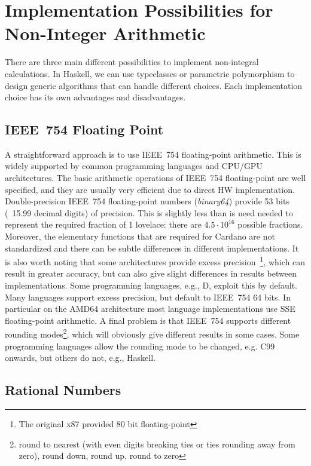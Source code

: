 \documentclass[11pt,a4paper,dvipsnames]{article}
\newcommand{\khcomment}[1]{\todo[color=blue!20]{KH: #1}}
\theoremstyle{definition}
\theoremstyle{definition}
\begin{document}
\section{Implementation Possibilities for Non-Integer Arithmetic}
\label{sec:impl-poss}

There are three main different possibilities to implement non-integral
calculations. In Haskell, we can use typeclasses or parametric polymorphism
to design generic algorithms that can handle different choices. Each implementation choice has its
own advantages and disadvantages.

\subsection{IEEE~754 Floating Point}
\label{sec:ieee-754-floating}

A straightforward approach is to use IEEE~754 floating-point arithmetic.  This is
widely supported by common programming languages and CPU/GPU architectures.
%
The basic arithmetic operations of IEEE~754 floating-point are well specified,
and they are usually very efficient due to direct HW implementation.
%
Double-precision IEEE~754 floating-point numbers (\emph{binary64}) provide 53 bits (~15.99 decimal digits) of
precision.  This is slightly less than is need needed to represent the
required fraction of 1 lovelace: there are $4.5\cdot10^{16}$ possible fractions.
Moreover, the  elementary functions that are required for Cardano are not standardized and there can be
subtle differences in different implementations. It is also worth noting that some architectures
provide excess precision~\footnote{The original x87 provided 80 bit
  floating-point}, which can result in greater accuracy, but can also give slight differences in results
between implementations. Some programming languages, e.g., D, exploit this by default. Many
languages support excess precision, but default to IEEE~754 64 bits. In
particular on the AMD64 architecture most language implementations use SSE floating-point arithmetic.
A final problem is that IEEE~754 supports different rounding modes\footnote{round to nearest (with even digits breaking ties or ties rounding away from zero), round down, round up, round to zero},  which will obviously give
different results in some cases.  Some programming languages allow the rounding mode to be changed, e.g. C99 onwards\khcomment{check}, but others do
not, e.g., Haskell.

\subsection{Rational Numbers}
\label{sec:rational-numbers}
\end{document}

